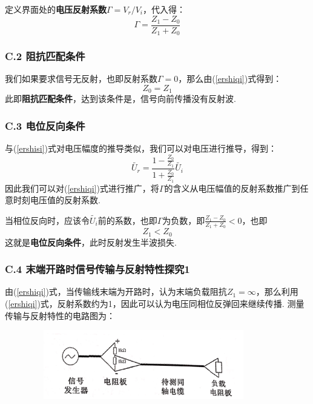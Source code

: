 \documentclass[UTF8]{ctexart}
\begin{document}
定义界面处的\textbf{电压反射系数}$\Gamma=V_r/V_i$，代入得：
\begin{equation}
    \Gamma=\frac{Z_1-Z_0}{Z_1+Z_0}
    \label{ershiqi}
\end{equation}
\subsubsection*{C.2 阻抗匹配条件}

我们如果要求信号无反射，也即反射系数$\Gamma=0$，那么由(\ref{ershiqi})式得到：
\begin{equation}
    Z_0=Z_1
    \label{sanshi}
\end{equation}
此即\textbf{阻抗匹配条件}，达到该条件是，信号向前传播没有反射波.
\subsubsection*{C.3 电位反向条件}
与(\ref{ershisi})式对电压幅度的推导类似，我们可以对电压进行推导，得到：
\begin{equation}
   \widetilde{U_r}=\frac{1-\frac{Z_0}{Z_1}}{1+\frac{Z_0}{Z_1}}\widetilde{U_i}
\end{equation}
因此我们可以对(\ref{ershiqi})式进行推广，将$\Gamma$的含义从电压幅值的反射系数推广到任意时刻电压值的反射系数.\par
当相位反向时，应该令$\widetilde{U_i}$前的系数，也即$\Gamma$为负数，即$\frac{Z_1-Z_0}{Z_1+Z_0}<0$，也即
\begin{equation}
   Z_1<Z_0
\end{equation}
这就是\textbf{电位反向条件}，此时反射发生半波损失.

\subsubsection*{C.4 末端开路时信号传输与反射特性探究1}

由(\ref{ershiqi})式，当传输线末端为开路时，认为末端负载阻抗$Z_1=\infty$，那么利用(\ref{ershiqi})式，反射系数约为1，因此可以认为电压同相位反弹回来继续传播. 
测量传输与反射特性的电路图为：
\begin{figure}[H]
    \centering
    \includegraphics[width=10cm,height=3cm]{6}      
\end{figure}
\end{document}

